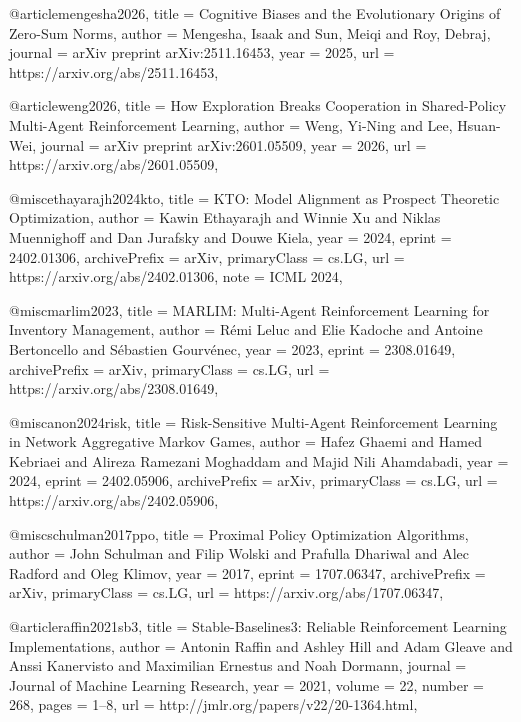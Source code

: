 @article{mengesha2026,
  title   = {Cognitive Biases and the Evolutionary Origins of Zero-Sum Norms},
  author  = {Mengesha, Isaak and Sun, Meiqi and Roy, Debraj},
  journal = {arXiv preprint arXiv:2511.16453},
  year    = {2025},
  url     = {https://arxiv.org/abs/2511.16453},
}

@article{weng2026,
  title   = {How Exploration Breaks Cooperation in Shared-Policy Multi-Agent Reinforcement Learning},
  author  = {Weng, Yi-Ning and Lee, Hsuan-Wei},
  journal = {arXiv preprint arXiv:2601.05509},
  year    = {2026},
  url     = {https://arxiv.org/abs/2601.05509},
}

@misc{ethayarajh2024kto,
  title         = {{KTO}: Model Alignment as Prospect Theoretic Optimization},
  author        = {Kawin Ethayarajh and Winnie Xu and Niklas Muennighoff and Dan Jurafsky and Douwe Kiela},
  year          = {2024},
  eprint        = {2402.01306},
  archivePrefix = {arXiv},
  primaryClass  = {cs.LG},
  url           = {https://arxiv.org/abs/2402.01306},
  note          = {ICML 2024},
}

@misc{marlim2023,
  title         = {{MARLIM}: Multi-Agent Reinforcement Learning for Inventory Management},
  author        = {R{\'e}mi Leluc and Elie Kadoche and Antoine Bertoncello and S{\'e}bastien Gourv{\'e}nec},
  year          = {2023},
  eprint        = {2308.01649},
  archivePrefix = {arXiv},
  primaryClass  = {cs.LG},
  url           = {https://arxiv.org/abs/2308.01649},
}

@misc{anon2024risk,
  title         = {Risk-Sensitive Multi-Agent Reinforcement Learning in Network Aggregative {Markov} Games},
  author        = {Hafez Ghaemi and Hamed Kebriaei and Alireza Ramezani Moghaddam and Majid Nili Ahamdabadi},
  year          = {2024},
  eprint        = {2402.05906},
  archivePrefix = {arXiv},
  primaryClass  = {cs.LG},
  url           = {https://arxiv.org/abs/2402.05906},
}

@misc{schulman2017ppo,
  title         = {Proximal Policy Optimization Algorithms},
  author        = {John Schulman and Filip Wolski and Prafulla Dhariwal and Alec Radford and Oleg Klimov},
  year          = {2017},
  eprint        = {1707.06347},
  archivePrefix = {arXiv},
  primaryClass  = {cs.LG},
  url           = {https://arxiv.org/abs/1707.06347},
}

@article{raffin2021sb3,
  title   = {Stable-Baselines3: Reliable Reinforcement Learning Implementations},
  author  = {Antonin Raffin and Ashley Hill and Adam Gleave and Anssi Kanervisto and Maximilian Ernestus and Noah Dormann},
  journal = {Journal of Machine Learning Research},
  year    = {2021},
  volume  = {22},
  number  = {268},
  pages   = {1--8},
  url     = {http://jmlr.org/papers/v22/20-1364.html},
}

